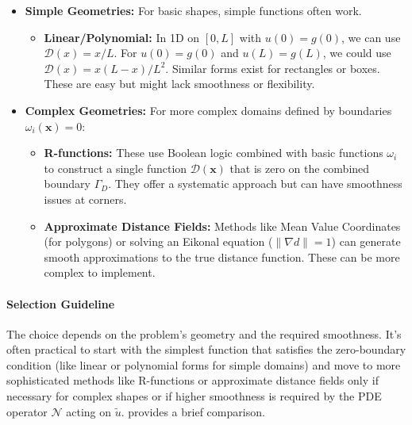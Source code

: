 \begin{itemize}
    \item \textbf{Simple Geometries:} For basic shapes, simple functions often work.
        \begin{itemize}
            \item \textbf{Linear/Polynomial:} In 1D on $[0,L]$ with $u(0)=g(0)$, we can use $\mathcal{D}(x) = x/L$. For $u(0)=g(0)$ and $u(L)=g(L)$, we could use $\mathcal{D}(x) = x(L-x)/L^2$. Similar forms exist for rectangles or boxes. These are easy but might lack smoothness or flexibility.
        \end{itemize}
    \item \textbf{Complex Geometries:} For more complex domains defined by boundaries $\omega_i(\mathbf{x})=0$:
        \begin{itemize}
            \item \textbf{R-functions:} These use Boolean logic combined with basic functions $\omega_i$ to construct a single function $\mathcal{D}(\mathbf{x})$ that is zero on the combined boundary $\Gamma_D$. They offer a systematic approach but can have smoothness issues at corners.
            \item \textbf{Approximate Distance Fields:} Methods like Mean Value Coordinates (for polygons) or solving an Eikonal equation ($\|\nabla d\| = 1$) can generate smooth approximations to the true distance function. These can be more complex to implement.
        \end{itemize}
\end{itemize}

\paragraph{Selection Guideline}
The choice depends on the problem's geometry and the required smoothness. It's often practical to start with the simplest function that satisfies the zero-boundary condition (like linear or polynomial forms for simple domains) and move to more sophisticated methods like R-functions or approximate distance fields only if necessary for complex shapes or if higher smoothness is required by the PDE operator $\mathcal{N}$ acting on $\tilde{u}$.  provides a brief comparison.

